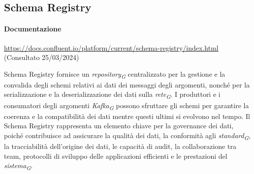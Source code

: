\subsection{Schema Registry} \label{sec:schema_registry}
\paragraph{Documentazione} \href{https://docs.confluent.io/platform/current/schema-registry/index.html}{https://docs.confluent.io/platform/current/schema-registry/index.html} (Consultato 25/03/2024)


Schema Registry fornisce un \textit{repository}\textsubscript{\textit{G}} centralizzato per la gestione e la convalida degli schemi relativi ai dati dei messaggi degli argomenti, nonché per la serializzazione e la deserializzazione dei dati sulla \textit{rete}\textsubscript{\textit{G}}. I produttori e i consumatori degli argomenti \textit{Kafka}\textsubscript{\textit{G}} possono sfruttare gli schemi per garantire la coerenza e la compatibilità dei dati mentre questi ultimi si evolvono nel tempo. Il Schema Registry rappresenta un elemento chiave per la governance dei dati, poiché contribuisce ad assicurare la qualità dei dati, la conformità agli \textit{standard}\textsubscript{\textit{G}}, la tracciabilità dell'origine dei dati, le capacità di audit, la collaborazione tra team, protocolli di sviluppo delle applicazioni efficienti e le prestazioni del \textit{sistema}\textsubscript{\textit{G}}.


